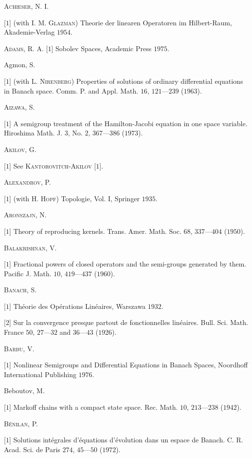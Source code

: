 \label{chap:BibliographyStale}

\textsc{Achieser}, N. I. 

[$1$] (with I. M. \textsc{Glazman}) Theorie der linearen Operatoren im Hilbert-Raum, Akademie-Verlag $1954$. 

\textsc{Adams}, R. A. [$1$] Sobolev Spaces, Academic Press $1975$. 

Agmon, S. 

[$1$] (with L. \textsc{Nirenberg}) Properties of solutions of ordinary differential equations in Banach space. Comm. P. and Appl. Math. $16$, $121$---$239$ ($1963$). 

\textsc{Aizawa}, S. 

[$1$] A semigroup treatment of the Hamilton-Jacobi equation in one space variable. Hiroshima Math. J. $3$, No. $2$, $367$---$386$ ($1973$). 

\textsc{Akilov}, G. 

[$1$] See \textsc{Kantorovitch}-\textsc{Akilov} [$1$]. 

\textsc{Alexandrov}, P. 

[$1$] (with H. \textsc{Hopf}) Topologie, Vol. I, Springer $1935$. 

\textsc{Aronszajn}, N. 

[$1$] Theory of reproducing kernels. Trans. Amer. Math. Soc. $68$, $337$---$404$ ($1950$). 

\textsc{Balakrishnan}, V. 

[$1$] Fractional powers of closed operators and the semi-groups generated by them. Pacific J. Math. $10$, $419$---$437$ ($1960$). 

\textsc{Banach}, S. 

[$1$] Théorie des Opérations Linéaires, Warszawa $1932$. 

[$2$] Sur la convergence presque partout de fonctionnelles linéaires. Bull. Sci. Math. France $50$, $27$---$32$ and $36$---$43$ ($1926$). 

\textsc{Barbu}, V. 

[$1$] Nonlinear Semigroups and Differential Equations in Banach Spaces, Noordhoff International Publishing $1976$. 

Beboutov, M. 

[$1$] Markoff chains with a compact state space. Rec. Math. $10$, $213$---$238$ ($1942$). 

\textsc{Bénilan}, P. 

[$1$] Solutions intégrales d'équations d'évolution dans un espace de Banach. C. R. Acad. Sci. de Paris $274$, $45$---$50$ ($1972$). 

